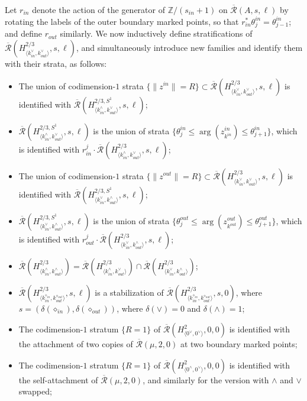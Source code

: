 \documentclass{article}
\def\Z{\mathbb{Z}}
\def\Rbar{\overline{\mathcal{R}}}
\begin{document}
Let $r_{in}$ denote the action of the generator of $\Z/(s_{in}+1)$ on $\Rbar(A,s,\ell)$ by rotating the labels of the outer boundary marked points, so that $r_{in}^*\theta^{in}_j = \theta^{in}_{j-1}$; and define $r_{out}$ similarly. 
We now inductively define stratifications of $\Rbar(H^{2/3}_{\langle k^\vee_{in},k^\vee_{out}\rangle},s,\ell)$, and simultaneously introduce new families and identify them with their strata, as follows:
\begin{itemize}
    \item The union of codimension-$1$ strata $\{\|z^{in}\| = R\} \subset \Rbar(H^{2/3}_{\langle k^\vee_{in},k^\vee_{out}\rangle},s,\ell)$ is identified with $\Rbar(H^{2/3,S^1}_{\langle k^\wedge_{in},k^\vee_{out}\rangle},s,\ell)$;
    \item $\Rbar(H^{2/3,S^1}_{\langle k^\wedge_{in},k^\vee_{out}\rangle},s,\ell)$ is the union of strata $\{\theta^{in}_j \le \arg(z^{in}_{k^{in}}) \le \theta^{in}_{j+1}\}$, which is identified with $r_{in}^j \cdot \Rbar(H^{2/3}_{\langle k^\wedge_{in},k^\vee_{out}\rangle},s,\ell)$;
    \item The union of codimension-$1$ strata $\{\|z^{out}\| = R\} \subset \Rbar(H^{2/3}_{\langle k^\vee_{in},k^\vee_{out}\rangle},s,\ell)$ is identified with $\Rbar(H^{2/3,S^1}_{\langle k^\vee_{in},k^\wedge_{out}\rangle},s,\ell)$;
    \item  $\Rbar(H^{2/3,S^1}_{\langle k^\vee_{in},k^\wedge_{out}\rangle},s,\ell)$ is the union of strata $\{\theta^{out}_j \le \arg(z^{out}_{k^{out}}) \le \theta^{out}_{j+1}\}$, which is identified with $r_{out}^j \cdot \Rbar(H^{2/3}_{\langle k^\vee_{in},k^\wedge_{out}\rangle},s,\ell)$;
    \item $\Rbar(H^{2/3}_{\langle k_{in}^\wedge,k_{out}^\wedge \rangle}) = \Rbar(H^{2/3}_{\langle k_{in}^\wedge,k_{out}^\vee \rangle }) \cap \Rbar(H^{2/3}_{\langle k_{in}^\vee,k_{out}^\wedge \rangle})$;
    \item $\Rbar(H^{2/3}_{\langle k_{in}^{\diamond_{in}},k_{out}^{\diamond_{out}} \rangle},s,\ell)$ is a stabilization of $\Rbar(H^{2/3}_{\langle k_{in}^{\diamond_{in}},k_{out}^{\diamond_{out}} \rangle},s,0)$, where $s=(\delta(\diamond_{in}),\delta(\diamond_{out}))$, where $\delta(\vee) = 0$ and $\delta(\wedge) = 1$;
    \item The codimension-$1$ stratum $\{R=1\}$ of $\Rbar(H^2_{\langle 0^\vee,0^\vee \rangle},0,0)$ is identified with the attachment of two copies of $\Rbar(\mu,2,0)$ at two boundary marked points;
    \item The codimension-$1$ stratum $\{R=1\}$ of $\Rbar(H^2_{\langle 0^\wedge,0^\vee\rangle},0,0)$ is identified with the self-attachment of $\Rbar(\mu,2,0)$, and similarly for the version with $\wedge$ and $\vee$ swapped;

\end{itemize}
\end{document}
